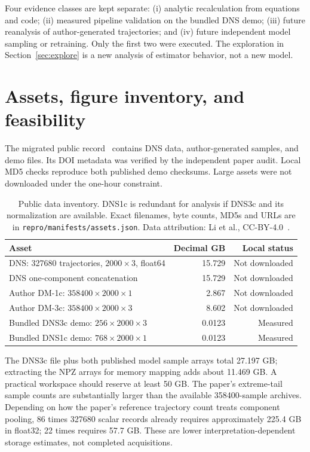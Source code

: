 \documentclass[10pt,a4paper]{article}
\begin{document}
Four evidence classes are kept separate: (i) analytic recalculation from equations and code; (ii) measured pipeline validation on the bundled DNS demo; (iii) future reanalysis of author-generated trajectories; and (iv) future independent model sampling or retraining. Only the first two were executed. The exploration in Section~\ref{sec:explore} is a new analysis of estimator behavior, not a new model.

\section{Assets, figure inventory, and feasibility}
The migrated public record\ \cite{data} contains DNS data, author-generated samples, and demo files. Its DOI metadata was verified by the independent paper audit. Local MD5 checks reproduce both published demo checksums. Large assets were not downloaded under the one-hour constraint.

\begin{table}[ht]
\centering\small
\begin{tabular}{L{64mm}rr}
\toprule Asset & Decimal GB & Local status\\\midrule
DNS: 327680 trajectories, $2000\times3$, float64 & 15.729 & Not downloaded\\
DNS one-component concatenation & 15.729 & Not downloaded\\
Author DM-1c: $358400\times2000\times1$ & 2.867 & Not downloaded\\
Author DM-3c: $358400\times2000\times3$ & 8.602 & Not downloaded\\
Bundled DNS3c demo: $256\times2000\times3$ & 0.0123 & Measured\\
Bundled DNS1c demo: $768\times2000\times1$ & 0.0123 & Measured\\
\bottomrule
\end{tabular}
\caption{Public data inventory. DNS1c is redundant for analysis if DNS3c and its normalization are available. Exact filenames, byte counts, MD5s and URLs are in \texttt{repro/manifests/assets.json}. Data attribution: Li et al., CC-BY-4.0\ \cite{data}.}
\end{table}

The DNS3c file plus both published model sample arrays total 27.197 GB; extracting the NPZ arrays for memory mapping adds about 11.469 GB. A practical workspace should reserve at least 50 GB. The paper's extreme-tail sample counts are substantially larger than the available 358400-sample archives. Depending on how the paper's reference trajectory count treats component pooling, 86 times 327680 scalar records already requires approximately 225.4 GB in float32; 22 times requires 57.7 GB. These are lower interpretation-dependent storage estimates, not completed acquisitions.
\end{document}
